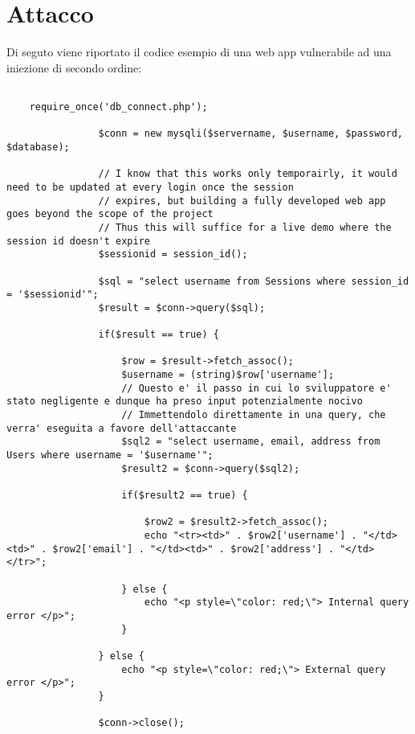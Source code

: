 \documentclass{book}
\begin{document}
\section{Attacco}
Di seguto viene riportato il codice esempio di una web app vulnerabile ad una iniezione di secondo ordine:
\\
\begin{lstlisting}
    
    require_once('db_connect.php');

                $conn = new mysqli($servername, $username, $password, $database);

                // I know that this works only temporairly, it would need to be updated at every login once the session
                // expires, but building a fully developed web app goes beyond the scope of the project
                // Thus this will suffice for a live demo where the session id doesn't expire
                $sessionid = session_id();

                $sql = "select username from Sessions where session_id = '$sessionid'";
                $result = $conn->query($sql);

                if($result == true) {

                    $row = $result->fetch_assoc();
                    $username = (string)$row['username'];
                    // Questo e' il passo in cui lo sviluppatore e' stato negligente e dunque ha preso input potenzialmente nocivo
                    // Immettendolo direttamente in una query, che verra' eseguita a favore dell'attaccante
                    $sql2 = "select username, email, address from Users where username = '$username'";
                    $result2 = $conn->query($sql2);

                    if($result2 == true) {

                        $row2 = $result2->fetch_assoc();
                        echo "<tr><td>" . $row2['username'] . "</td><td>" . $row2['email'] . "</td><td>" . $row2['address'] . "</td></tr>"; 

                    } else {
                        echo "<p style=\"color: red;\"> Internal query error </p>";
                    }

                } else {
                    echo "<p style=\"color: red;\"> External query error </p>";
                }

                $conn->close();

\end{lstlisting}
\end{document}

